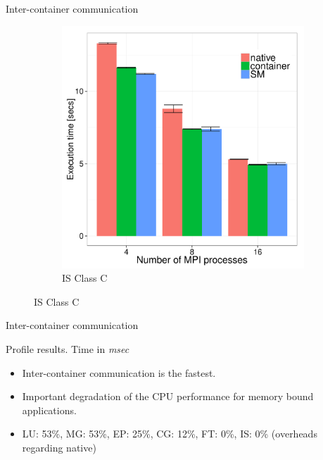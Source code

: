 \documentclass[presentation]{beamer}
\begin{document}
\begin{frame}[label=sec-3-5]{Inter-container communication}
\begin{figure}[H]
\begin{subfigure}[b]{0.42\textwidth}
    \includegraphics[scale=0.25,angle=0]{figures/inter-container-isC.pdf}
    \caption{IS Class C}
  \end{subfigure}
\end{figure}
\end{frame}

\begin{frame}[label=sec-3-6]{Inter-container communication}
\begin{table}
  \scriptsize



\caption{Profile results. Time in \textit{msec}}

\end{table}


\begin{itemize}
\item Inter-container communication is the fastest.
\item Important degradation of the CPU performance for memory bound applications.
\item LU: 53\%, MG: 53\%, EP: 25\%, CG: 12\%, FT: 0\%, IS: 0\% (overheads regarding native)
\end{itemize}
\end{frame}
\end{document}
